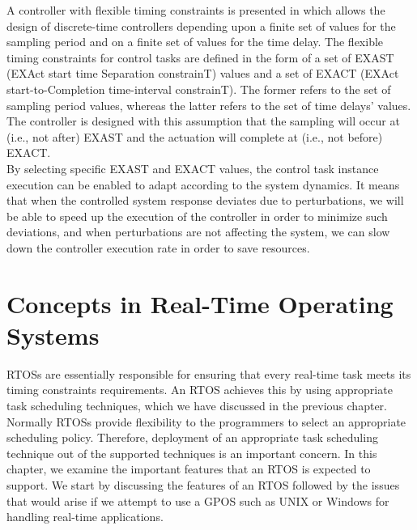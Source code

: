 \documentclass[12pt]{report}
\begin{document}
A controller with flexible timing constraints is presented in \cite{qoc} which allows the design of discrete-time controllers depending upon a finite set of values for the sampling period and on a finite set of values for the time delay.  The flexible timing constraints for control tasks are defined in the form of a set of EXAST (EXAct start time Separation constrainT) values and a set of EXACT (EXAct start-to-Completion time-interval constrainT). The former refers to the set of sampling period values, whereas the latter refers to the set of time delays’ values.  The controller is designed with this assumption that the sampling will occur at (i.e., not after) EXAST and the actuation will complete at (i.e., not before) EXACT. \\

By selecting specific EXAST and EXACT values, the control task instance execution can be enabled to adapt according to the system dynamics. It means that when the controlled system response deviates due to perturbations, we will be able to speed up the execution of the controller in order to minimize such deviations, and when perturbations are not affecting the system, we can slow down the controller execution rate in order to save resources. 


\chapter{Concepts in Real-Time Operating Systems}
RTOSs are essentially responsible for ensuring that every real-time task meets its timing constraints requirements. An RTOS achieves this by using appropriate task scheduling techniques, which we have discussed in the previous chapter. Normally RTOSs provide flexibility to the programmers to select an appropriate scheduling policy. Therefore, deployment of an appropriate task scheduling technique out of the supported techniques is an important concern. In this chapter, we examine the important features that an RTOS is expected to support. We start by discussing the features of an RTOS followed by the issues that would arise if we attempt to use a GPOS such as UNIX or Windows for handling real-time applications. 
\end{document}
